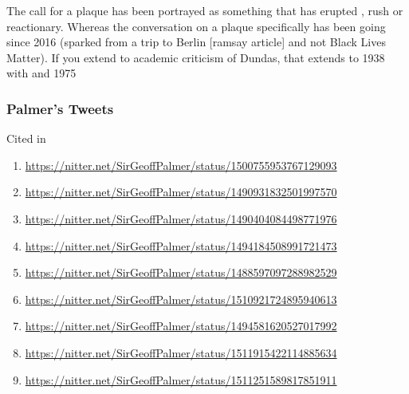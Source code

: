 \documentclass{scrartcl}
\begin{document}



The call for a plaque has been portrayed as something that has erupted \cite{daily_2017}, rush or reactionary. Whereas the conversation on a plaque specifically has been going since 2016 (sparked from a trip to Berlin [ramsay article] and not Black Lives Matter). If you extend to academic criticism of Dundas, that extends to 1938 with \cite{williams_1938} and 1975 \cite{davis_1975}

\subsubsection{Palmer's Tweets}

Cited in \cite{mccarthy_2022_2}

\begin{enumerate}
    \item \url{https://nitter.net/SirGeoffPalmer/status/1500755953767129093}
    \item \url{https://nitter.net/SirGeoffPalmer/status/1490931832501997570}
    \item \url{https://nitter.net/SirGeoffPalmer/status/1490404084498771976}
    \item \url{https://nitter.net/SirGeoffPalmer/status/1494184508991721473}
    \item \url{https://nitter.net/SirGeoffPalmer/status/1488597097288982529}
    \item \url{https://nitter.net/SirGeoffPalmer/status/1510921724895940613}
    \item \url{https://nitter.net/SirGeoffPalmer/status/1494581620527017992}
    \item \url{https://nitter.net/SirGeoffPalmer/status/1511915422114885634}
    \item \url{https://nitter.net/SirGeoffPalmer/status/1511251589817851911}
\end{enumerate}
\end{document}
